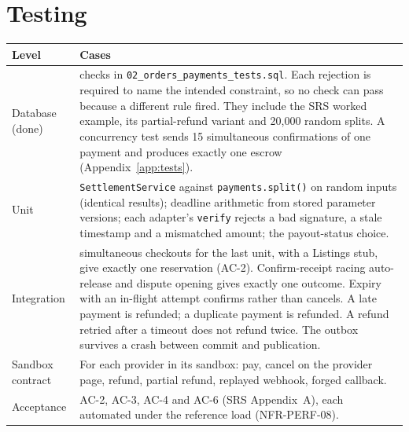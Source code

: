 \documentclass[11pt,a4paper]{article}
\newenvironment{dtable}[1]{\small\begin{longtable}{#1}}{\end{longtable}}
\begin{document}
\section{Testing}
\begin{dtable}{@{}>{\raggedright\arraybackslash}p{3.2cm}>{\raggedright\arraybackslash}p{12cm}@{}}
\toprule
\textbf{Level} & \textbf{Cases} \\ \midrule \endhead
Database (done) & 45 checks in \texttt{02\_orders\_payments\_tests.sql}. Each rejection is required to name the intended constraint, so no check can pass because a different rule fired. They include the SRS worked example, its partial-refund variant and 20{,}000 random splits. A concurrency test sends 15 simultaneous confirmations of one payment and produces exactly one escrow (Appendix~\ref{app:tests}). \\
Unit & \texttt{SettlementService} against \texttt{payments.split()} on random inputs (identical results); deadline arithmetic from stored parameter versions; each adapter's \texttt{verify} rejects a bad signature, a stale timestamp and a mismatched amount; the payout-status choice. \\
Integration & 50 simultaneous checkouts for the last unit, with a Listings stub, give exactly one reservation (AC-2). Confirm-receipt racing auto-release and dispute opening gives exactly one outcome. Expiry with an in-flight attempt confirms rather than cancels. A late payment is refunded; a duplicate payment is refunded. A refund retried after a timeout does not refund twice. The outbox survives a crash between commit and publication. \\
Sandbox contract & For each provider in its sandbox: pay, cancel on the provider page, refund, partial refund, replayed webhook, forged callback. \\
Acceptance & AC-2, AC-3, AC-4 and AC-6 (SRS Appendix~A), each automated under the reference load (NFR-PERF-08). \\
\bottomrule
\end{dtable}

\end{document}
